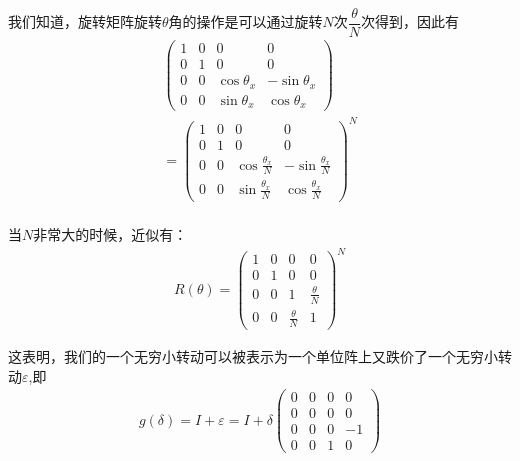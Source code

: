 \documentclass{article}
\begin{document}
我们知道，旋转矩阵旋转$\theta$角的操作是可以通过旋转$N$次$\dfrac{\theta}{N}$次得到，因此有
\begin{align*}
    \begin{pmatrix}
        1&0&0&0\\
        0&1&0&0\\
        0&0&\cos\theta_x&-\sin\theta_x\\
        0&0&\sin\theta_x&\cos\theta_x
    \end{pmatrix}\\
    =
    \begin{pmatrix}
        1&0&0&0\\
        0&1&0&0\\
        0&0&\cos{\frac{\theta_x}{N}}&-\sin\frac{\theta_x}{N}\\
        0&0&\sin\frac{\theta_x}{N}&\cos{\frac{\theta_x}{N}}
    \end{pmatrix}^N\\
\end{align*}

当$N$非常大的时候，近似有：
\begin{align*}
    R(\theta)=
    \begin{pmatrix}
        1&0&0&0\\
        0&1&0&0\\
        0&0&1&\frac{\theta}{N}\\
        0&0&\frac{\theta}{N}&1
    \end{pmatrix}^N
\end{align*}

这表明，我们的一个无穷小转动可以被表示为一个单位阵上又跌价了一个无穷小转动$\varepsilon$,即
\begin{align*}
    g(\delta)=I+\varepsilon=I+\delta
    \begin{pmatrix}
        0&0&0&0\\
        0&0&0&0\\
        0&0&0&-1\\
        0&0&1&0
    \end{pmatrix}
\end{align*}
\end{document}
